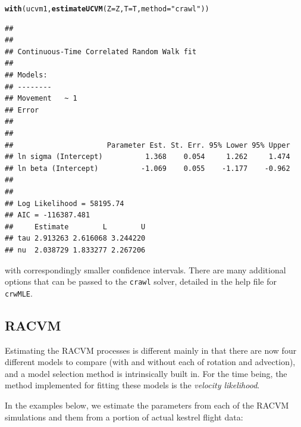 \documentclass[10pt]{article}\usepackage[]{graphicx}\usepackage[]{color}
\makeatletter
\newcommand{\hlstr}[1]{\textcolor[rgb]{0.192,0.494,0.8}{#1}}%
\newcommand{\hlstd}[1]{\textcolor[rgb]{0.345,0.345,0.345}{#1}}%
\newcommand{\hlkwc}[1]{\textcolor[rgb]{0.333,0.667,0.333}{#1}}%
\newcommand{\hlkwd}[1]{\textcolor[rgb]{0.737,0.353,0.396}{\textbf{#1}}}%
\newenvironment{kframe}{%
 \def\at@end@of@kframe{}%
 \ifinner\ifhmode%
  \def\at@end@of@kframe{\end{minipage}}%
  \begin{minipage}{\columnwidth}%
 \fi\fi%
 \def\FrameCommand##1{\hskip\@totalleftmargin \hskip-\fboxsep
 \colorbox{shadecolor}{##1}\hskip-\fboxsep
     \hskip-\linewidth \hskip-\@totalleftmargin \hskip\columnwidth}%
 \MakeFramed {\advance\hsize-\width
   \@totalleftmargin\z@ \linewidth\hsize
   \@setminipage}}%
 {\par\unskip\endMakeFramed%
 \at@end@of@kframe}
\newenvironment{knitrout}{}{} %
\makeatother
\begin{document}
\begin{knitrout}
\color{fgcolor}\begin{kframe}
\begin{alltt}
\hlkwd{with}\hlstd{(ucvm1,} \hlkwd{estimateUCVM}\hlstd{(}\hlkwc{Z} \hlstd{= Z,} \hlkwc{T} \hlstd{= T,} \hlkwc{method} \hlstd{=} \hlstr{"crawl"}\hlstd{))}
\end{alltt}


{\ttfamily\noindent\itshape\color{messagecolor}{\#\# Beginning SANN initialization ...}}

{\ttfamily\noindent\itshape\color{messagecolor}{\#\# Beginning likelihood optimization ...}}\begin{verbatim}
## 
## 
## Continuous-Time Correlated Random Walk fit
## 
## Models:
## --------
## Movement   ~ 1
## Error   
## 
## 
##                      Parameter Est. St. Err. 95% Lower 95% Upper
## ln sigma (Intercept)          1.368    0.054     1.262     1.474
## ln beta (Intercept)          -1.069    0.055    -1.177    -0.962
## 
## 
## Log Likelihood = 58195.74 
## AIC = -116387.481
##     Estimate        L        U
## tau 2.913263 2.616068 3.244220
## nu  2.038729 1.833277 2.267206
\end{verbatim}
\end{kframe}
\end{knitrout}

\noindent with correspondingly smaller confidence intervals. There are many additional options that can be passed to the \texttt{crawl} solver, detailed in the help file for \texttt{crwMLE}.  

\subsection{RACVM}

Estimating the RACVM processes is different mainly in that there are now four different models to compare (with and without each of rotation and advection), and a model selection method is intrinsically built in.  For the time being, the method implemented for fitting these models is the \emph{velocity likelihood}.  

\noindent In the examples below, we estimate the parameters from each of the RACVM simulations and them from a portion of actual kestrel flight data:
\end{document}
